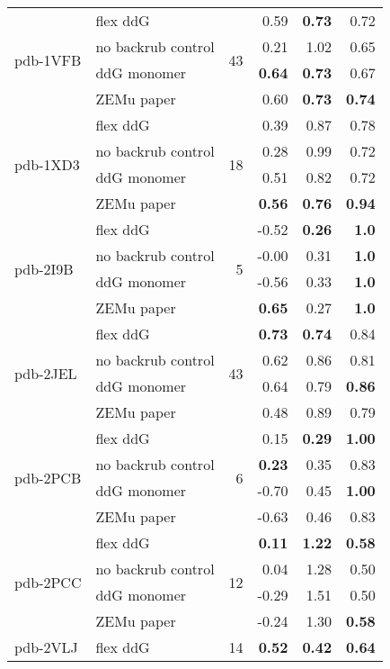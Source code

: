 \begin{longtable}{llrrrr}
\hline
 \multirow{ 4}{*}{pdb-1VFB} & flex ddG & \multirow{ 4}{*}{43} & 0.59 & \textbf{0.73} & 0.72  \\
 & no backrub control & & 0.21 & 1.02 & 0.65  \\
 & ddG monomer & & \textbf{0.64} & \textbf{0.73} & 0.67  \\
 & ZEMu paper & & 0.60 & \textbf{0.73} & \textbf{0.74}  \\
\hline
 \multirow{ 4}{*}{pdb-1XD3} & flex ddG & \multirow{ 4}{*}{18} & 0.39 & 0.87 & 0.78  \\
 & no backrub control & & 0.28 & 0.99 & 0.72  \\
 & ddG monomer & & 0.51 & 0.82 & 0.72  \\
 & ZEMu paper & & \textbf{0.56} & \textbf{0.76} & \textbf{0.94}  \\
\hline
 \multirow{ 4}{*}{pdb-2I9B} & flex ddG & \multirow{ 4}{*}{5} & -0.52 & \textbf{0.26} & \textbf{1.0}  \\
 & no backrub control & & -0.00 & 0.31 & \textbf{1.0}  \\
 & ddG monomer & & -0.56 & 0.33 & \textbf{1.0}  \\
 & ZEMu paper & & \textbf{0.65} & 0.27 & \textbf{1.0}  \\
\hline
 \multirow{ 4}{*}{pdb-2JEL} & flex ddG & \multirow{ 4}{*}{43} & \textbf{0.73} & \textbf{0.74} & 0.84  \\
 & no backrub control & & 0.62 & 0.86 & 0.81  \\
 & ddG monomer & & 0.64 & 0.79 & \textbf{0.86}  \\
 & ZEMu paper & & 0.48 & 0.89 & 0.79  \\
\hline
 \multirow{ 4}{*}{pdb-2PCB} & flex ddG & \multirow{ 4}{*}{6} & 0.15 & \textbf{0.29} & \textbf{1.00}  \\
 & no backrub control & & \textbf{0.23} & 0.35 & 0.83  \\
 & ddG monomer & & -0.70 & 0.45 & \textbf{1.00}  \\
 & ZEMu paper & & -0.63 & 0.46 & 0.83  \\
\hline
 \multirow{ 4}{*}{pdb-2PCC} & flex ddG & \multirow{ 4}{*}{12} & \textbf{0.11} & \textbf{1.22} & \textbf{0.58}  \\
 & no backrub control & & 0.04 & 1.28 & 0.50  \\
 & ddG monomer & & -0.29 & 1.51 & 0.50  \\
 & ZEMu paper & & -0.24 & 1.30 & \textbf{0.58}  \\
\hline
 \multirow{ 4}{*}{pdb-2VLJ} & flex ddG & \multirow{ 4}{*}{14} & \textbf{0.52} & \textbf{0.42} & \textbf{0.64}  \\

\end{longtable}
